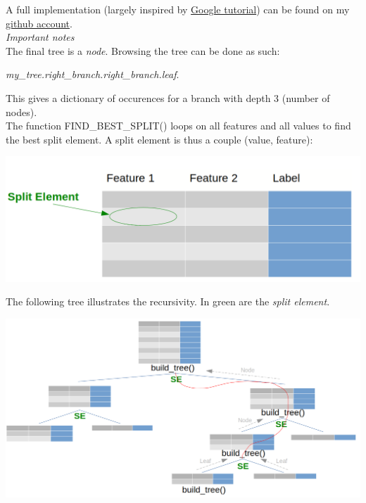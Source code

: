 A full implementation (largely inspired by \href{https://github.com/random-forests/tutorials/blob/master/decision_tree.ipynb}{Google tutorial}) can be found on my \href{https://github.com/savoga/various_projects/blob/master/trees_from_scratch.py}{github account}. \\

\textit{Important notes} \\

The final tree is a \textit{node}. Browsing the tree can be done as such: 

\textit{my\_tree.right\_branch.right\_branch.leaf}. 

This gives a dictionary of occurences for a branch with depth 3 (number of nodes). \\

The function FIND\_BEST\_SPLIT() loops on all features and all values to find the best split element. A split element is thus a couple (value, feature):

\begin{center}
\includegraphics[scale=0.2]{trees_split_element.png}
\end{center}

The following tree illustrates the recursivity. In green are the \textit{split element}.

\begin{center}
\includegraphics[scale=0.3]{trees_recursivity.png}
\end{center}

